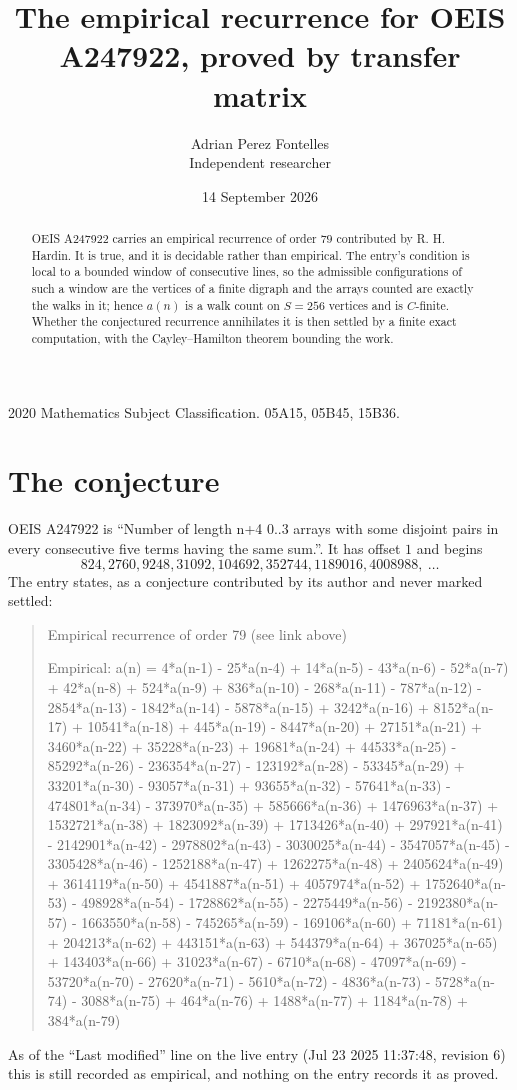 \documentclass[11pt,a4paper]{article}
\title{The empirical recurrence for OEIS A247922, proved by transfer matrix}
\author{Adrian Perez Fontelles\\ \small Independent researcher}
\date{14 September 2026}
\theoremstyle{plain}
\theoremstyle{definition}
\begin{document}
\maketitle

\begin{abstract}
OEIS A247922 carries an empirical recurrence of order $79$ contributed by R. H. Hardin. It is
true, and it is decidable rather than empirical. The entry's condition is local to a bounded window of consecutive lines, so
the admissible configurations of such a window are the vertices of a finite digraph and the
arrays counted are exactly the walks in it; hence $a(n)$ is a walk count on $S=256$ vertices
and is $C$-finite. Whether the conjectured recurrence annihilates it is then settled by a
finite exact computation, with the Cayley--Hamilton theorem bounding the work.
\end{abstract}

\noindent\small 2020 Mathematics Subject Classification. 05A15, 05B45, 15B36.\normalsize

\section{The conjecture}

OEIS A247922 is ``Number of length n+4 0..3 arrays with some disjoint pairs in every consecutive five terms having the same sum.''. It has offset $1$ and begins
\[
824, 2760, 9248, 31092, 104692, 352744, 1189016, 4008988,\ \dots
\]
The entry states, as a conjecture contributed by its author and never marked settled:
\begin{quote}\raggedright\small
Empirical recurrence of order 79 (see link above)

Empirical: a(n) = 4*a(n-1) - 25*a(n-4) + 14*a(n-5) - 43*a(n-6) - 52*a(n-7) + 42*a(n-8) + 524*a(n-9) + 836*a(n-10) - 268*a(n-11) - 787*a(n-12) - 2854*a(n-13) - 1842*a(n-14) - 5878*a(n-15) + 3242*a(n-16) + 8152*a(n-17) + 10541*a(n-18) + 445*a(n-19) - 8447*a(n-20) + 27151*a(n-21) + 3460*a(n-22) + 35228*a(n-23) + 19681*a(n-24) + 44533*a(n-25) - 85292*a(n-26) - 236354*a(n-27) - 123192*a(n-28) - 53345*a(n-29) + 33201*a(n-30) - 93057*a(n-31) + 93655*a(n-32) - 57641*a(n-33) - 474801*a(n-34) - 373970*a(n-35) + 585666*a(n-36) + 1476963*a(n-37) + 1532721*a(n-38) + 1823092*a(n-39) + 1713426*a(n-40) + 297921*a(n-41) - 2142901*a(n-42) - 2978802*a(n-43) - 3030025*a(n-44) - 3547057*a(n-45) - 3305428*a(n-46) - 1252188*a(n-47) + 1262275*a(n-48) + 2405624*a(n-49) + 3614119*a(n-50) + 4541887*a(n-51) + 4057974*a(n-52) + 1752640*a(n-53) - 498928*a(n-54) - 1728862*a(n-55) - 2275449*a(n-56) - 2192380*a(n-57) - 1663550*a(n-58) - 745265*a(n-59) - 169106*a(n-60) + 71181*a(n-61) + 204213*a(n-62) + 443151*a(n-63) + 544379*a(n-64) + 367025*a(n-65) + 143403*a(n-66) + 31023*a(n-67) - 6710*a(n-68) - 47097*a(n-69) - 53720*a(n-70) - 27620*a(n-71) - 5610*a(n-72) - 4836*a(n-73) - 5728*a(n-74) - 3088*a(n-75) + 464*a(n-76) + 1488*a(n-77) + 1184*a(n-78) + 384*a(n-79)
\end{quote}
As of the ``Last modified'' line on the live entry (Jul 23 2025 11:37:48, revision 6) this is still
recorded as empirical, and nothing on the entry records it as proved.
\end{document}
